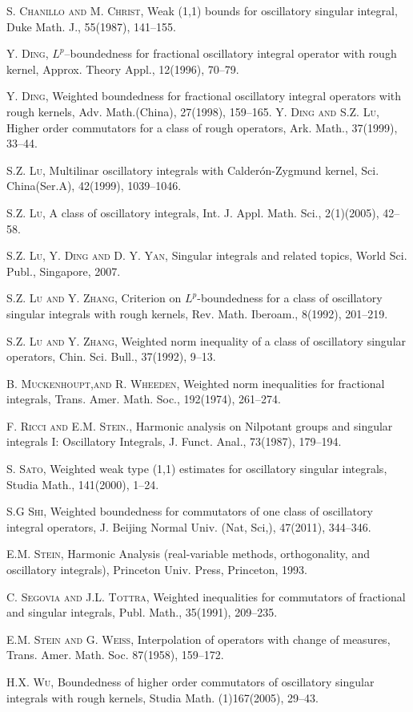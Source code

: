 \documentclass[reqno,12pt]{amsart}
\numberwithin{equation}{section}
\theoremstyle{plain}
\theoremstyle{definition}
\begin{document}
\begin{thebibliography}{99}

\textsc{S. Chanillo and M. Christ},
Weak (1,1) bounds for oscillatory singular integral, Duke Math. J., 55(1987),  141--155.

\textsc{Y. Ding}, $L^{p}$--boundedness for fractional oscillatory integral operator with rough kernel,
Approx. Theory Appl., 12(1996), 70--79.

\textsc{Y. Ding}, Weighted boundedness for fractional oscillatory integral operators with rough kernels,
Adv. Math.(China), 27(1998), 159--165.
\textsc{Y. Ding and S.Z. Lu}, Higher order commutators for a class of rough operators,
Ark. Math., 37(1999), 33--44.

\textsc{S.Z. Lu},
Multilinar oscillatory integrals with Calder\'{o}n-Zygmund kernel, Sci. China(Ser.A), 42(1999), 1039--1046.

\textsc{S.Z. Lu},
A class of oscillatory integrals, Int. J. Appl. Math. Sci., 2(1)(2005), 42--58.

\textsc{S.Z. Lu, Y. Ding and D. Y. Yan},
Singular integrals and related topics, World Sci. Publ., Singapore, 2007.

\textsc{S.Z. Lu and Y. Zhang},
Criterion on $L^{p}$-boundedness for a class of oscillatory singular integrals with rough kernels, Rev. Math.
Iberoam., 8(1992), 201--219.

\textsc{S.Z. Lu and Y. Zhang},
Weighted norm inequality of a class of oscillatory singular operators, Chin. Sci. Bull., 37(1992), 9--13.

\textsc{B. Muckenhoupt,and R. Wheeden}, Weighted norm inequalities for
fractional integrals, Trans. Amer. Math. Soc., 192(1974), 261--274.

\textsc{F. Ricci and E.M. Stein.},
Harmonic analysis on Nilpotant groups and singular integrals I: Oscillatory Integrals, J. Funct. Anal., 73(1987), 179--194.

\textsc{S. Sato},
Weighted weak type (1,1) estimates for oscillatory singular integrals, Studia Math., 141(2000), 1--24.

\textsc{S.G Shi},
Weighted boundedness for commutators of one class of oscillatory integral operators, J. Beijing Normal Univ. (Nat, Sci,), 47(2011),  344--346.

\textsc{E.M. Stein}, Harmonic Analysis (real-variable methods,
orthogonality, and oscillatory integrals), Princeton Univ. Press,
Princeton, 1993.

\textsc{C. Segovia and J.L. Tottra},
Weighted inequalities for commutators of fractional and singular integrals, Publ. Math., 35(1991), 209--235.

\textsc{E.M. Stein and G. Weiss},
Interpolation of operators with change of measures, Trans. Amer. Math. Soc. 87(1958), 159--172.

\textsc{H.X. Wu}, Boundedness of higher order commutators of oscillatory singular integrals with rough kernels, Studia Math. (1)167(2005), 29--43.

\end{thebibliography}
\end{document}
